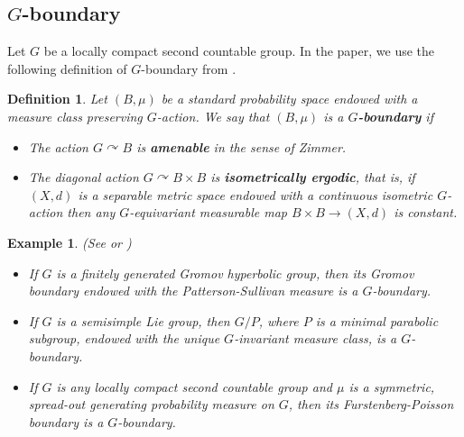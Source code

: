 \documentclass{amsart}
\numberwithin{equation}{section}
\newtheorem{defi}[thm]{Definition}
\newtheorem{exm}[thm]{Example}
\theoremstyle{definition}
\begin{document}
\subsection{\texorpdfstring{$G$-boundary}{G-boundary}}
Let $G$ be a locally compact second countable group. In the paper, we use the following definition of $G$-boundary from \cite{BaderFurman}.
\begin{defi}\label{def_G_boundary}
    Let $(B,\mu)$ be a standard probability space endowed with a measure class preserving $G$-action. We say that $(B,\mu)$ is a \textbf{\textit{$G$-boundary}} if 
    \begin{itemize}
        \item The action $G\curvearrowright B$ is \textbf{\textit{amenable}} in the sense of Zimmer.
        \item The diagonal action $G\curvearrowright B\times B$ is \textbf{\textit{isometrically ergodic}}, that is, if $(X,d)$ is a separable metric space endowed with a continuous isometric $G$-action then any $G$-equivariant measurable map $B\times B\rightarrow (X,d)$ is constant.
    \end{itemize}
\end{defi}
\begin{exm} (See \cite{BCFS} or \cite{BaderFurman})
    \begin{itemize}
        \item If $G$ is a finitely generated Gromov hyperbolic group, then its Gromov boundary endowed with the Patterson-Sullivan measure is a $G$-boundary. 
        \item If $G$ is a semisimple Lie group, then $G/P$, where $P$ is a minimal parabolic subgroup, endowed with the unique $G$-invariant measure class, is a $G$-boundary.
        \item If $G$ is any locally compact second countable group and $\mu$ is a symmetric, spread-out generating probability measure on $G$, then its Furstenberg-Poisson boundary is a $G$-boundary.
    \end{itemize}
\end{exm}
\end{document}
